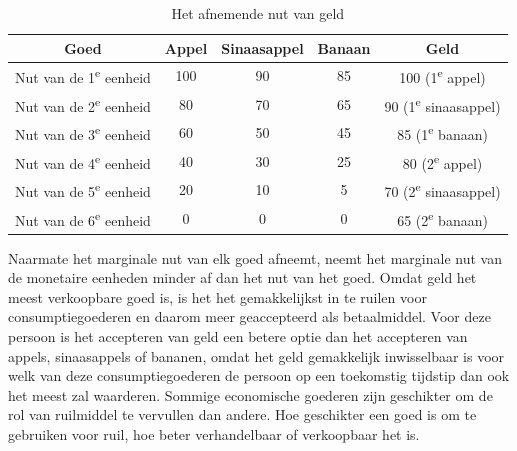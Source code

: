 \begin{table}[!htb]
\centering
\begin{tabular}{|c|c|c|c|c|}  %
\hline  %
    \cellcolor{gray!25} Goed &
    \cellcolor{gray!25} Appel &
    \cellcolor{gray!25} Sinaasappel &
    \cellcolor{gray!25} Banaan &
    \cellcolor{gray!25} Geld \\
\hline  %
 Nut van de 1\textsuperscript{e} eenheid & 100 & 90 & 85 & 100 (1\textsuperscript{e} appel) \\ \hline
 Nut van de 2\textsuperscript{e} eenheid & 80 & 70 & 65 & 90 (1\textsuperscript{e} sinaasappel) \\ \hline
 Nut van de 3\textsuperscript{e} eenheid & 60 & 50 & 45 & 85 (1\textsuperscript{e} banaan) \\ \hline
 Nut van de 4\textsuperscript{e} eenheid & 40 & 30 & 25 & 80 (2\textsuperscript{e} appel) \\ \hline
 Nut van de 5\textsuperscript{e} eenheid & 20 & 10 & 5 & 70 (2\textsuperscript{e} sinaasappel) \\ \hline
 Nut van de 6\textsuperscript{e} eenheid & 0 & 0 & 0 & 65 (2\textsuperscript{e} banaan) \\ \hline  %
\end{tabular}
\caption{Het afnemende nut van geld}
\label{tab1}
\end{table}



Naarmate het marginale nut van elk goed afneemt, neemt het marginale nut van de monetaire eenheden minder af dan het nut van het goed. Omdat geld het meest verkoopbare goed is, is het het gemakkelijkst in te ruilen voor consumptiegoederen en daarom meer geaccepteerd als betaalmiddel. Voor deze persoon is het accepteren van geld een betere optie dan het accepteren van appels, sinaasappels of bananen, omdat het geld gemakkelijk inwisselbaar is voor welk van deze consumptiegoederen de persoon op een toekomstig tijdstip dan ook het meest zal waarderen. Sommige economische goederen zijn geschikter om de rol van ruilmiddel te vervullen dan andere. Hoe geschikter een goed is om te gebruiken voor ruil, hoe beter verhandelbaar of verkoopbaar het is.

